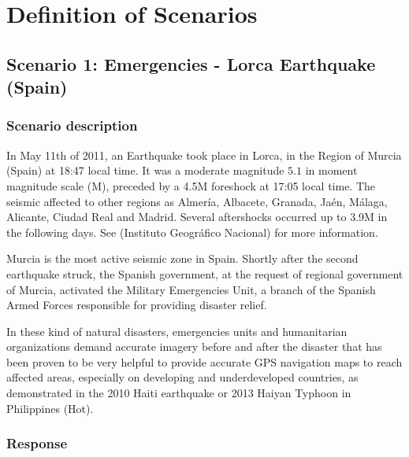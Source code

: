 \chapter{Definition of Scenarios}
\label{anex:scenarios}

\section{Scenario 1: Emergencies - Lorca Earthquake (Spain)}
\subsection{Scenario description}
In May 11th of 2011, an Earthquake took place in Lorca, in the Region of Murcia (Spain) at 18:47 local time. It was a moderate magnitude $5.1$ in moment magnitude scale (M), preceded by a 4.5M foreshock at 17:05 local time. The seismic affected to other regions as Almería, Albacete, Granada, Jaén, Málaga, Alicante, Ciudad Real and Madrid. Several aftershocks occurred up to 3.9M in the following days. See (Instituto Geográfico Nacional) for more information.

Murcia is the most active seismic zone in Spain. Shortly after the second earthquake struck, the Spanish government, at the request of regional government of Murcia, activated the Military Emergencies Unit, a branch of the Spanish Armed Forces responsible for providing disaster relief. 

In these kind of natural disasters, emergencies units and humanitarian organizations demand accurate imagery before and after the disaster that has been proven to be very helpful to provide accurate \ac{GPS} navigation maps to reach affected areas, especially on developing and underdeveloped countries, as demonstrated in the 2010 Haiti earthquake or 2013 Haiyan Typhoon in Philippines (Hot).

\subsection{Response}

